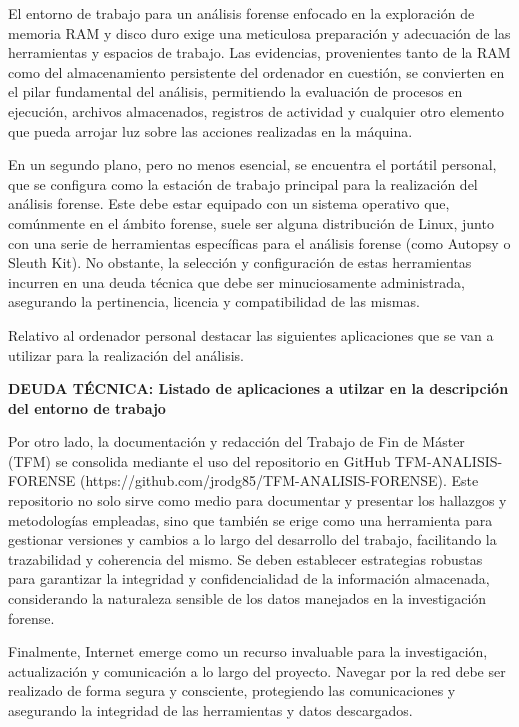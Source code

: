 El entorno de trabajo para un análisis forense enfocado en la exploración de memoria RAM y disco duro exige una meticulosa preparación y adecuación de las herramientas y espacios de trabajo. Las evidencias, provenientes tanto de la RAM como del almacenamiento persistente del ordenador en cuestión, se convierten en el pilar fundamental del análisis, permitiendo la evaluación de procesos en ejecución, archivos almacenados, registros de actividad y cualquier otro elemento que pueda arrojar luz sobre las acciones realizadas en la máquina.

En un segundo plano, pero no menos esencial, se encuentra el portátil personal, que se configura como la estación de trabajo principal para la realización del análisis forense. Este debe estar equipado con un sistema operativo que, comúnmente en el ámbito forense, suele ser alguna distribución de Linux, junto con una serie de herramientas específicas para el análisis forense (como Autopsy o Sleuth Kit). No obstante, la selección y configuración de estas herramientas incurren en una deuda técnica que debe ser minuciosamente administrada, asegurando la pertinencia, licencia y compatibilidad de las mismas.

Relativo al ordenador personal destacar las siguientes aplicaciones que se van a utilizar para la realización del análisis.

{\color{red}\textbf{DEUDA TÉCNICA: Listado de aplicaciones a utilzar en la descripción del entorno de trabajo}}

Por otro lado, la documentación y redacción del Trabajo de Fin de Máster (TFM) se consolida mediante el uso del repositorio en GitHub TFM-ANALISIS-FORENSE (https://github.com/jrodg85/TFM-ANALISIS-FORENSE). Este repositorio no solo sirve como medio para documentar y presentar los hallazgos y metodologías empleadas, sino que también se erige como una herramienta para gestionar versiones y cambios a lo largo del desarrollo del trabajo, facilitando la trazabilidad y coherencia del mismo. Se deben establecer estrategias robustas para garantizar la integridad y confidencialidad de la información almacenada, considerando la naturaleza sensible de los datos manejados en la investigación forense.

Finalmente, Internet emerge como un recurso invaluable para la investigación, actualización y comunicación a lo largo del proyecto. Navegar por la red debe ser realizado de forma segura y consciente, protegiendo las comunicaciones y asegurando la integridad de las herramientas y datos descargados. 